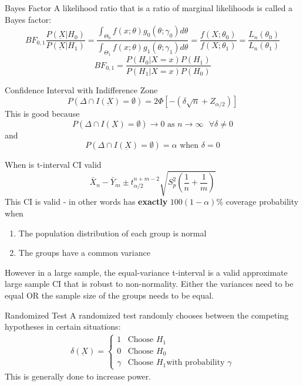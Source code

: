 \documentclass[avery5388,grid,frame]{flashcards}
\begin{document}
\begin{flashcard}[Definition]{Bayes Factor}
\bigskip\bigskip\bigskip
A likelihood ratio that is a ratio of marginal likelihoods is called a Bayes factor:
\begin{equation*}
BF_{0,1}\frac{P(\underbar{X}|H_0)}{P(\underbar{X}|H_1)}=\frac{\int _{\Theta_0}f(x;\theta)g_0(\theta;\gamma_0)d\theta}{\int_{\Theta_1} f(x;\theta)g_1(\theta;\gamma_1)d\theta}=\frac{f(X;\theta_0)}{f(X;\theta_1)}=\frac{L_n(\theta_0)}{L_n(\theta_1)}
\end{equation*}
\begin{equation*}
BF_{0,1}=\frac{P(H_0|X=x)P(H_1)}{P(H_1|X=x)P(H_0)}
\end{equation*}
\end{flashcard}
\begin{flashcard}[Definition]{Confidence Interval with Indifference Zone}
\bigskip\bigskip\bigskip
\begin{equation*}
P(\Delta\cap I(\underbar{X})=\emptyset)=2\Phi[-(\delta\sqrt{n}+Z_{\alpha/2})]
\end{equation*}
This is good because
\begin{equation*}
P(\Delta\cap I(\underbar{X})=\emptyset)\rightarrow 0\textrm{ as }n\rightarrow\infty\textrm{  }\forall\delta\neq0
\end{equation*}
and
\begin{equation*}
P(\Delta\cap I(\underbar{X})=\emptyset)=\alpha \textrm{ when }\delta=0
\end{equation*}
\end{flashcard}
\begin{flashcard}{When is t-interval CI valid}
\bigskip\bigskip\bigskip
\begin{equation*}
\bar{X}_n-\bar{Y}_m\pm t_{\alpha/2}^{n+m-2}\sqrt{S^2_p\left(\frac{1}{n}+\frac{1}{m}\right)}
\end{equation*}
This CI is valid - in other words has \textbf{exactly} $100(1-\alpha)\%$ coverage probability when
\begin{enumerate}
\item The population distribution of each group is normal
\item The groups have a common variance
\end{enumerate}
However in a large sample, the equal-variance t-interval is a valid approximate large sample CI that is robust to non-normality. Either the variances need to be equal OR the sample size of the groups needs to be equal.
\end{flashcard}
\begin{flashcard}[Definition]{Randomized Test}
\bigskip\bigskip
A randomized test randomly chooses between the competing hypotheses in certain situations:
{\begin{align*}
\delta(\underbar{X})=\begin{cases}
1&\textrm{Choose }H_1\\
0&\textrm{Choose }H_0\\
\gamma&\textrm{Choose }H_1\textrm{with probability }\gamma
\end{cases}
\end{align*}}
This is generally done to increase power.
\end{flashcard}
\end{document}
